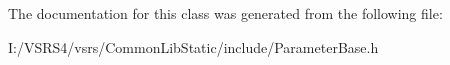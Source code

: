 The documentation for this class was generated from the following file\+:\begin{DoxyCompactItemize}
\item 
I\+:/\+V\+S\+R\+S4/vsrs/\+Common\+Lib\+Static/include/Parameter\+Base.\+h\end{DoxyCompactItemize}
